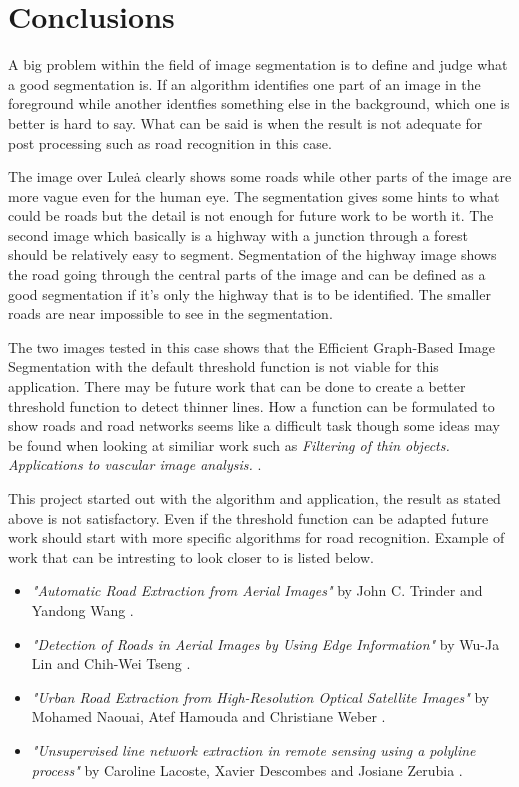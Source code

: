 \section{Conclusions}
A big problem within the field of image segmentation is to define and judge
what a good segmentation is. If an algorithm identifies one part of an image
in the foreground while another identfies something else in the background, which
one is better is hard to say. What can be said is when the result is not adequate
for post processing such as road recognition in this case.

The image over Lule\.{a} clearly shows some roads while other parts of the
image are more vague even for the human eye. The segmentation gives some hints
to what could be roads but the detail is not enough for future work to be worth it.
The second image which basically is a highway with a junction through a forest
should be relatively easy to segment. Segmentation of the highway image shows
the road going through the central parts of the image and can be defined as
a good segmentation if it's only the highway that is to be identified. The smaller
roads are near impossible to see in the segmentation.

The two images tested in this case shows that the Efficient Graph-Based Image Segmentation
with the default threshold function is not viable for this application. There
may be future work that can be done to create a better threshold function to
detect thinner lines. How a function can be formulated to show roads and road
networks seems like a difficult task though some ideas may be found when looking
at similiar work such as {\em Filtering of thin objects. Applications
to vascular image analysis.} \cite{olena2010}.

This project started out with the algorithm and application, the result as stated
above is not satisfactory. Even if the threshold function can be adapted future work
should start with more specific algorithms for road recognition.
Example of work that can be intresting to look closer to is listed below.
\begin{itemize}
  \item {\em "Automatic Road Extraction from Aerial Images"} by John C. Trinder and
Yandong Wang \cite{trinder1998}.
  \item {\em "Detection of Roads in Aerial Images by
Using Edge Information"} by Wu-Ja Lin and Chih-Wei Tseng \cite{lin2012}.
  \item {\em "Urban Road Extraction from High-Resolution Optical Satellite Images"} by
Mohamed Naouai, Atef Hamouda and Christiane Weber \cite{naouai2010}.
  \item {\em "Unsupervised line network extraction in remote sensing using a polyline
      process"} by Caroline Lacoste, Xavier Descombes and Josiane Zerubia \cite{lacoste2009}.
\end{itemize}

